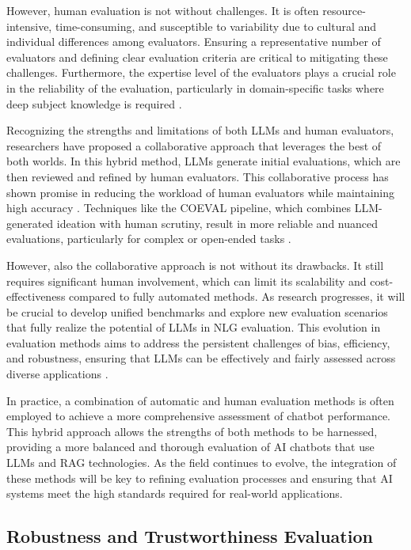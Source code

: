 However, human evaluation is not without challenges. It is often resource-intensive, time-consuming, and susceptible to variability due to cultural and individual differences among evaluators. Ensuring a representative number of evaluators and defining clear evaluation criteria are critical to mitigating these challenges. Furthermore, the expertise level of the evaluators plays a crucial role in the reliability of the evaluation, particularly in domain-specific tasks where deep subject knowledge is required \cite{chang2024survey}.

Recognizing the strengths and limitations of both LLMs and human evaluators, researchers have proposed a collaborative approach that leverages the best of both worlds. In this hybrid method, LLMs generate initial evaluations, which are then reviewed and refined by human evaluators. This collaborative process has shown promise in reducing the workload of human evaluators while maintaining high accuracy \cite{li2023collaborative}. Techniques like the COEVAL pipeline, which combines LLM-generated ideation with human scrutiny, result in more reliable and nuanced evaluations, particularly for complex or open-ended tasks \cite{zhang2021human}.

However, also the collaborative approach is not without its drawbacks. It still requires significant human involvement, which can limit its scalability and cost-effectiveness compared to fully automated methods. As research progresses, it will be crucial to develop unified benchmarks and explore new evaluation scenarios that fully realize the potential of LLMs in NLG evaluation. This evolution in evaluation methods aims to address the persistent challenges of bias, efficiency, and robustness, ensuring that LLMs can be effectively and fairly assessed across diverse applications \cite{gao2023retrieval}.

In practice, a combination of automatic and human evaluation methods is often employed to achieve a more comprehensive assessment of chatbot performance. This hybrid approach allows the strengths of both methods to be harnessed, providing a more balanced and thorough evaluation of AI chatbots that use LLMs and RAG technologies. As the field continues to evolve, the integration of these methods will be key to refining evaluation processes and ensuring that AI systems meet the high standards required for real-world applications.

\subsection{Robustness and Trustworthiness Evaluation}

